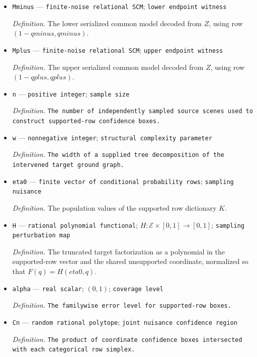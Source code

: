 \documentclass{article}
\begin{document}
\begin{itemize}
  \par\smallskip\noindent\emph{Definition.} The skeptical rational-arithmetic checker constructed in \(\text{def:checker}\).
  \item \texttt{Mminus} --- \texttt{finite-\allowbreak{}noise relational SCM}; \texttt{lower endpoint witness}
  \par\smallskip\noindent\emph{Definition.} The lower serialized common model decoded from \(Z\), using row \((1-qminus,qminus)\).
  \item \texttt{Mplus} --- \texttt{finite-\allowbreak{}noise relational SCM}; \texttt{upper endpoint witness}
  \par\smallskip\noindent\emph{Definition.} The upper serialized common model decoded from \(Z\), using row \((1-qplus,qplus)\).
  \item \texttt{n} --- \texttt{positive integer}; \texttt{sample size}
  \par\smallskip\noindent\emph{Definition.} \texttt{The number of independently sampled source scenes used to construct supported-\allowbreak{}row confidence boxes.}
  \item \texttt{w} --- \texttt{nonnegative integer}; \texttt{structural complexity parameter}
  \par\smallskip\noindent\emph{Definition.} \texttt{The width of a supplied tree decomposition of the intervened target ground graph.}
  \item \texttt{eta0} --- \texttt{finite vector of conditional probability rows}; \texttt{sampling nuisance}
  \par\smallskip\noindent\emph{Definition.} The population values of the supported row dictionary \(K\).
  \item \texttt{H} --- \texttt{rational polynomial functional}; \(H:\mathcal E\times[0,1]\to[0,1]\); \texttt{sampling perturbation map}
  \par\smallskip\noindent\emph{Definition.} The truncated target factorization as a polynomial in the supported-row vector and the shared unsupported coordinate, normalized so that \(F(q)=H(eta0,q)\).
  \item \texttt{alpha} --- \texttt{real scalar}; \((0,1)\); \texttt{coverage level}
  \par\smallskip\noindent\emph{Definition.} \texttt{The familywise error level for supported-\allowbreak{}row boxes.}
  \item \texttt{Cn} --- \texttt{random rational polytope}; \texttt{joint nuisance confidence region}
  \par\smallskip\noindent\emph{Definition.} \texttt{The product of coordinate confidence boxes intersected with each categorical row simplex.}

\end{itemize}
\end{document}
